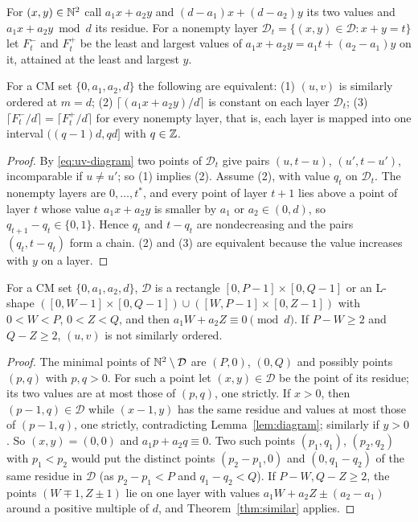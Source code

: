 For $(x,y)\in\mathbb{N}^2$ call $a_1x+a_2y$ and $(d-a_1)x+(d-a_2)y$ its two values and $a_1x+a_2y\bmod d$ its residue. For a nonempty layer $\mathcal D_t=\{(x,y)\in\mathcal D:x+y=t\}$ let $F^-_t$ and $F^+_t$ be the least and largest values of $a_1x+a_2y=a_1t+(a_2-a_1)y$ on it, attained at the least and largest $y$.

\begin{theorem}\label{thm:similar}
For a CM set $\{0,a_1,a_2,d\}$ the following are equivalent:
(1) $(u,v)$ is similarly ordered at $m=d$;
(2) $\lceil(a_1x+a_2y)/d\rceil$ is constant on each layer $\mathcal D_t$;
(3) $\lceil F^-_t/d\rceil=\lceil F^+_t/d\rceil$ for every nonempty layer, that is, each layer is mapped into one interval $((q-1)d,qd]$ with $q\in\mathbb{Z}$.
\end{theorem}

\begin{proof}
By \eqref{eq:uv-diagram} two points of $\mathcal D_t$ give pairs $(u,t-u)$, $(u',t-u')$, incomparable if $u\ne u'$; so (1) implies (2). Assume (2), with value $q_t$ on $\mathcal D_t$. The nonempty layers are $0,\dots,t^*$, and every point of layer $t+1$ lies above a point of layer $t$ whose value $a_1x+a_2y$ is smaller by $a_1$ or $a_2\in(0,d)$, so $q_{t+1}-q_t\in\{0,1\}$. Hence $q_t$ and $t-q_t$ are nondecreasing and the pairs $(q_t,t-q_t)$ form a chain. (2) and (3) are equivalent because the value increases with $y$ on a layer.
\end{proof}

\begin{proposition}[Shape]\label{prop:shape}
For a CM set $\{0,a_1,a_2,d\}$, $\mathcal D$ is a rectangle $[0,P-1]\times[0,Q-1]$ or an L-shape $([0,W-1]\times[0,Q-1])\cup([W,P-1]\times[0,Z-1])$ with $0<W<P$, $0<Z<Q$, and then $a_1W+a_2Z\equiv0\pmod d$. If $P-W\ge2$ and $Q-Z\ge2$, $(u,v)$ is not similarly ordered.
\end{proposition}

\begin{proof}
The minimal points of $\mathbb{N}^2\setminus\mathcal D$ are $(P,0)$, $(0,Q)$ and possibly points $(p,q)$ with $p,q>0$. For such a point let $(x,y)\in\mathcal D$ be the point of its residue; its two values are at most those of $(p,q)$, one strictly. If $x>0$, then $(p-1,q)\in\mathcal D$ while $(x-1,y)$ has the same residue and values at most those of $(p-1,q)$, one strictly, contradicting Lemma~\ref{lem:diagram}; similarly if $y>0$. So $(x,y)=(0,0)$ and $a_1p+a_2q\equiv0$. Two such points $(p_1,q_1)$, $(p_2,q_2)$ with $p_1<p_2$ would put the distinct points $(p_2-p_1,0)$ and $(0,q_1-q_2)$ of the same residue in $\mathcal D$ (as $p_2-p_1<P$ and $q_1-q_2<Q$). If $P-W,Q-Z\ge2$, the points $(W\mp1,Z\pm1)$ lie on one layer with values $a_1W+a_2Z\pm(a_2-a_1)$ around a positive multiple of $d$, and Theorem~\ref{thm:similar} applies.
\end{proof}

